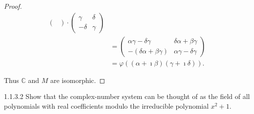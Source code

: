 \begin{proof}
\begin{align*}
\begin{pmatrix}
		                                                                   \end{pmatrix} \cdot \begin{pmatrix}
			                                                                                       \gamma  & \delta \\
			                                                                                       -\delta & \gamma
		                                                                                       \end{pmatrix}                        \\
		                                                               & = \begin{pmatrix}
			                                                                   \alpha\gamma - \delta\gamma   & \delta\alpha + \beta\gamma  \\
			                                                                   -(\delta\alpha + \beta\gamma) & \alpha\gamma - \delta\gamma
		                                                                   \end{pmatrix} \\
		                                                               & = \varphi((\alpha + \imath\beta)(\gamma + \imath\delta)).
	\end{align*}
	\endgroup

	Thus \( \mathbb{C} \) and \( M \) are isomorphic.
\end{proof}

\begin{problem}{1.1.3.2}
Show that the complex-number system can be thought of as the field of all polynomials with real coefficients modulo the irreducible polynomial \( x^{2} + 1 \).
\end{problem}

